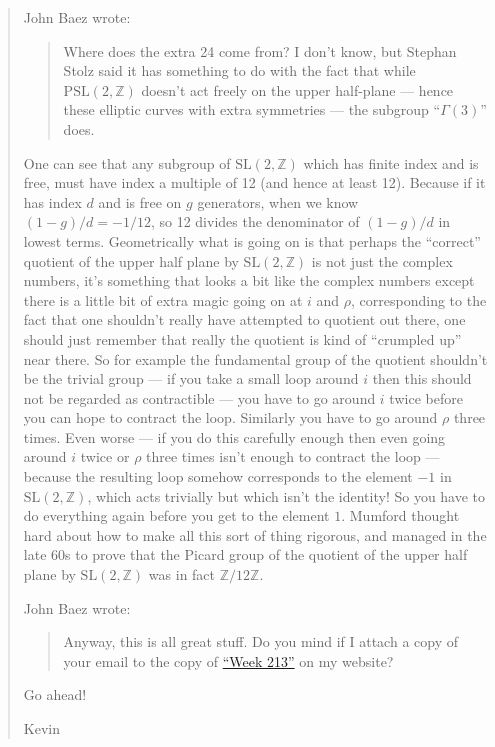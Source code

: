 \documentclass{article}
\begin{document}
\begin{quote}
John Baez wrote:

\begin{quote}
Where does the extra 24 come from? I don't know, but Stephan Stolz said
it has something to do with the fact that while
\(\mathrm{PSL}(2,\mathbb{Z})\) doesn't act freely on the upper
half-plane --- hence these elliptic curves with extra symmetries --- the
subgroup ``\(\Gamma(3)\)'' does.
\end{quote}

One can see that any subgroup of \(\mathrm{SL}(2,\mathbb{Z})\) which has
finite index and is free, must have index a multiple of 12 (and hence at
least 12). Because if it has index \(d\) and is free on \(g\)
generators, when we know \((1-g)/d=-1/12\), so 12 divides the
denominator of \((1-g)/d\) in lowest terms. Geometrically what is going
on is that perhaps the ``correct'' quotient of the upper half plane by
\(\mathrm{SL}(2,\mathbb{Z})\) is not just the complex numbers, it's
something that looks a bit like the complex numbers except there is a
little bit of extra magic going on at \(i\) and \(\rho\), corresponding
to the fact that one shouldn't really have attempted to quotient out
there, one should just remember that really the quotient is kind of
``crumpled up'' near there. So for example the fundamental group of the
quotient shouldn't be the trivial group --- if you take a small loop
around \(i\) then this should not be regarded as contractible --- you
have to go around \(i\) twice before you can hope to contract the loop.
Similarly you have to go around \(\rho\) three times. Even worse --- if
you do this carefully enough then even going around \(i\) twice or
\(\rho\) three times isn't enough to contract the loop --- because the
resulting loop somehow corresponds to the element \(-1\) in
\(\mathrm{SL}(2,\mathbb{Z})\), which acts trivially but which isn't the
identity! So you have to do everything again before you get to the
element \(1\). Mumford thought hard about how to make all this sort of
thing rigorous, and managed in the late 60s to prove that the Picard
group of the quotient of the upper half plane by
\(\mathrm{SL}(2,\mathbb{Z})\) was in fact \(\mathbb{Z}/12\mathbb{Z}\).

John Baez wrote:

\begin{quote}
Anyway, this is all great stuff. Do you mind if I attach a copy of your
email to the copy of \protect\hyperlink{week213}{``Week 213''} on my
website?
\end{quote}

Go ahead!

Kevin
\end{quote}
\end{document}

